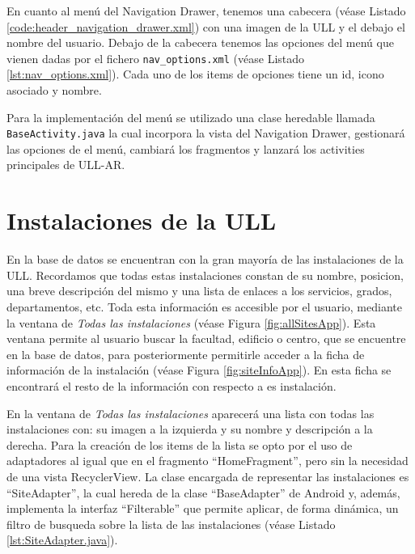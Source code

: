 En cuanto al menú del Navigation Drawer, tenemos una cabecera (véase Listado \ref{code:header_navigation_drawer.xml}) con una imagen de la ULL y el debajo el nombre del usuario. Debajo de la cabecera tenemos las opciones del menú que vienen dadas por el fichero \texttt{nav\_options.xml} (véase Listado \ref{lst:nav_options.xml}). Cada uno de los items de opciones tiene un id, icono asociado y nombre.



   



Para la implementación del menú se utilizado una clase heredable llamada \texttt{BaseActivity.java} la cual incorpora la vista del Navigation Drawer, gestionará las opciones de el menú, cambiará los fragmentos y lanzará los activities principales de ULL-AR. 






        
\section{Instalaciones de la ULL}

En la base de datos se encuentran con la gran mayoría de las instalaciones de la ULL. Recordamos que todas estas instalaciones constan de su nombre, posicion, una breve descripción del mismo y una lista de enlaces a los servicios, grados, departamentos, etc. Toda esta información es accesible por el usuario, mediante la ventana de \textit{Todas las instalaciones} (véase Figura \ref{fig:allSitesApp}). Esta ventana permite al usuario buscar la facultad, edificio o centro, que se encuentre en la base de datos, para posteriormente permitirle acceder a la ficha de información de la instalación (véase Figura \ref{fig:siteInfoApp}). En esta ficha se encontrará el resto de la información con respecto a es instalación.

En la ventana de \textit{Todas las instalaciones}  aparecerá una lista con todas las instalaciones con: su imagen a la izquierda y su nombre y descripción a la derecha. Para la creación de los items de la lista se opto por el uso de adaptadores al igual que en el fragmento ``HomeFragment'', pero sin la necesidad de una vista RecyclerView. La clase encargada de representar las instalaciones es ``SiteAdapter'', la cual hereda de la clase ``BaseAdapter'' de Android y, además, implementa la interfaz ``Filterable'' que permite aplicar, de forma dinámica, un filtro de busqueda sobre la lista de las instalaciones (véase Listado \ref{lst:SiteAdapter.java}). 




